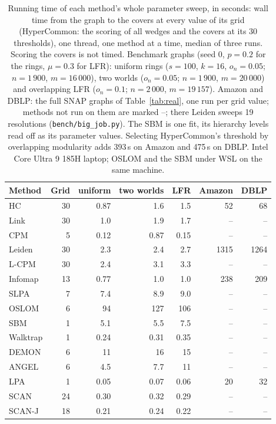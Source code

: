\begin{table}[h]
\caption{Running time of each method's whole parameter sweep, in seconds: wall time from the graph to the covers at every value of its grid (HyperCommon: the scoring of all wedges and the covers at its 30 thresholds), one thread, one method at a time, median of three runs. Scoring the covers is not timed. Benchmark graphs (seed 0, $p=0.2$ for the rings, $\mu=0.3$ for LFR): uniform rings ($s=100$, $k=16$, $o_n=0.05$; $n=1\,900$, $m=16\,000$), two worlds ($o_n=0.05$; $n=1\,900$, $m=20\,000$) and overlapping LFR ($o_n=0.1$; $n=2\,000$, $m=19\,157$). Amazon and DBLP: the full SNAP graphs of Table~\ref{tab:real}, one run per grid value; methods not run on them are marked --; there Leiden sweeps 19 resolutions (\texttt{bench/big\_job.py}). The SBM is one fit, its hierarchy levels read off as its parameter values. Selecting HyperCommon's threshold by overlapping modularity adds 393\,s on Amazon and 475\,s on DBLP. Intel Core Ultra 9 185H laptop; OSLOM and the SBM under WSL on the same machine.}
\label{tab:S-times}
\begin{ruledtabular}
\begin{tabular}{lrrrrrr}
Method & Grid & uniform & two worlds & LFR & Amazon & DBLP \\
\hline
HC & 30 & 0.87 & 1.6 & 1.5 & 52 & 68 \\
Link & 30 & 1.0 & 1.9 & 1.7 & -- & -- \\
CPM & 5 & 0.12 & 0.87 & 0.15 & -- & -- \\
Leiden & 30 & 2.3 & 2.4 & 2.7 & 1315 & 1264 \\
L-CPM & 30 & 2.4 & 3.1 & 3.3 & -- & -- \\
Infomap & 13 & 0.77 & 1.0 & 1.0 & 238 & 209 \\
SLPA & 7 & 7.4 & 8.9 & 9.0 & -- & -- \\
OSLOM & 6 & 94 & 127 & 106 & -- & -- \\
SBM & 1 & 5.1 & 5.5 & 7.5 & -- & -- \\
Walktrap & 1 & 0.24 & 0.31 & 0.35 & -- & -- \\
DEMON & 6 & 11 & 16 & 15 & -- & -- \\
ANGEL & 6 & 4.5 & 7.7 & 11 & -- & -- \\
LPA & 1 & 0.05 & 0.07 & 0.06 & 20 & 32 \\
SCAN & 24 & 0.30 & 0.32 & 0.29 & -- & -- \\
SCAN-J & 18 & 0.21 & 0.24 & 0.22 & -- & -- \\
\end{tabular}
\end{ruledtabular}
\end{table}
